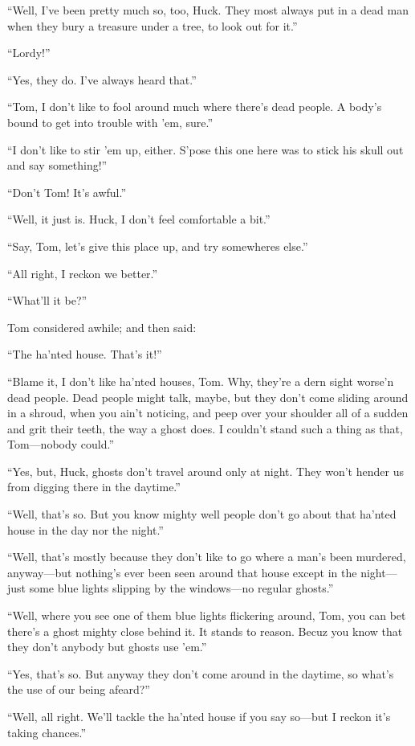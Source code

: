 \documentclass{book}
\begin{document}
“Well, I’ve been pretty much so, too, Huck. They most always put in a dead man when they bury a treasure under a tree, to look out for it.”

“Lordy!”

“Yes, they do. I’ve always heard that.”

“Tom, I don’t like to fool around much where there’s dead people. A body’s bound to get into trouble with ’em, sure.”

“I don’t like to stir ’em up, either. S’pose this one here was to stick his skull out and say something!”

“Don’t Tom! It’s awful.”

“Well, it just is. Huck, I don’t feel comfortable a bit.”

“Say, Tom, let’s give this place up, and try somewheres else.”

“All right, I reckon we better.”

“What’ll it be?”

Tom considered awhile; and then said:

“The ha’nted house. That’s it!”

“Blame it, I don’t like ha’nted houses, Tom. Why, they’re a dern sight worse’n dead people. Dead people might talk, maybe, but they don’t come sliding around in a shroud, when you ain’t noticing, and peep over your shoulder all of a sudden and grit their teeth, the way a ghost does. I couldn’t stand such a thing as that, Tom—nobody could.”

“Yes, but, Huck, ghosts don’t travel around only at night. They won’t hender us from digging there in the daytime.”

“Well, that’s so. But you know mighty well people don’t go about that ha’nted house in the day nor the night.”

“Well, that’s mostly because they don’t like to go where a man’s been murdered, anyway—but nothing’s ever been seen around that house except in the night—just some blue lights slipping by the windows—no regular ghosts.”

“Well, where you see one of them blue lights flickering around, Tom, you can bet there’s a ghost mighty close behind it. It stands to reason. Becuz you know that they don’t anybody but ghosts use ’em.”

“Yes, that’s so. But anyway they don’t come around in the daytime, so what’s the use of our being afeard?”

“Well, all right. We’ll tackle the ha’nted house if you say so—but I reckon it’s taking chances.”
\end{document}
